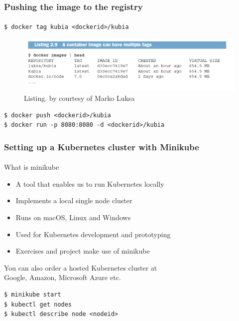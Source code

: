 \begin{frame}[fragile]
	\frametitle{Pushing the image to the registry}
	\framesubtitle{}
	\begin{lstlisting}[numbers=none, basicstyle=\ttfamily]
$ docker tag kubia <dockerid>/kubia
	\end{lstlisting}
	\begin{figure}[htbp!]
		\includegraphics[width=1\textwidth]{listings/2_9.png}
		\caption{Listing. by courtesy of Marko Luksa\cite{Luksa2018}}
		\label{fig:}
	\end{figure}
	\begin{lstlisting}[numbers=none, basicstyle=\ttfamily]
$ docker push <dockerid>/kubia
$ docker run -p 8080:8080 -d <dockerid>/kubia
	\end{lstlisting}
\end{frame}

\begin{frame}[fragile]
	\frametitle{Setting up a Kubernetes cluster with Minikube}
	\framesubtitle{}
	What is minikube
	\begin{itemize}
		\item A tool that enables us to run Kubernetes locally
		\item Implements a local single node cluster
		\item Runs on macOS, Linux and Windows
		\item Used for Kubernetes development and prototyping
		\item Exercises and project make use of minikube
	\end{itemize}
	You can also order a hosted Kubernetes cluster at \\
	Google, Amazon, Microsoft Azure etc.
	\begin{lstlisting}[numbers=none, basicstyle=\ttfamily]
$ minikube start
$ kubectl get nodes
$ kubectl describe node <nodeid>
	\end{lstlisting}
\end{frame}

